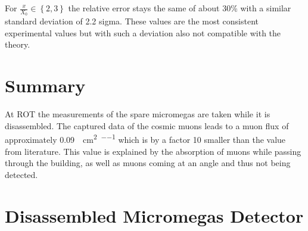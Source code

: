 \documentclass[sn-mathphys-num,iicol]{sn-jnl}
\theoremstyle{thmstyleone}
\theoremstyle{thmstyletwo}
\theoremstyle{thmstylethree}
\begin{document}
For $\tfrac{x}{X_0} \in \left\{2,3\right\}$ the relative error stays the same of about 30\% with a similar standard deviation of 2.2 sigma.
These values are the most consistent experimental values but with such a deviation also not compatible with the theory.











\section{Summary}
At ROT the measurements of the spare micromegas are taken while it is disassembled.
The captured data of the cosmic muons leads to a muon flux of approximately \SI{.09}{\per\centi\meter\squared\per\min} which is by a factor 10 smaller than the value from literature.
This value is explained by the absorption of muons while passing through the building, as well as muons coming at an angle and thus not being detected.


\clearpage\appendix\onecolumn


\section{Disassembled Micromegas Detector}
\renewcommand{\thefigure}{\Alph{section}\arabic{figure}}
\setcounter{figure}{0}
\renewcommand{\thetable}{\Alph{section}\arabic{table}}
\setcounter{table}{0}
\end{document}

